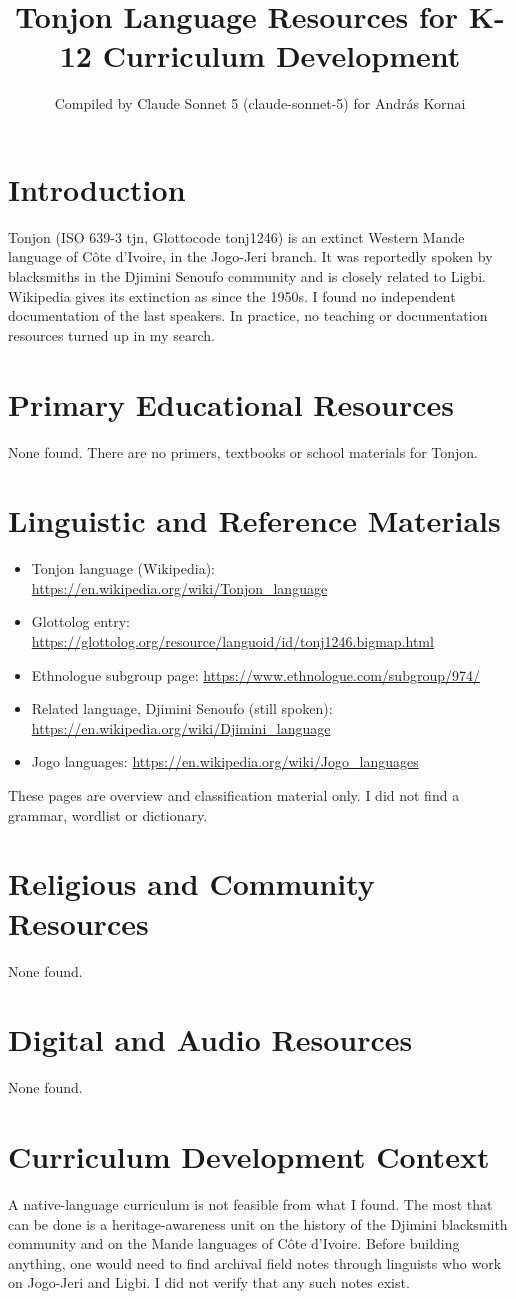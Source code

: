 \documentclass[12pt]{article}
\title{Tonjon Language Resources for K-12 Curriculum Development}
\author{Compiled by Claude Sonnet 5 (claude-sonnet-5) for Andr\'as Kornai}
\date{}
\begin{document}
\maketitle

\section{Introduction}
Tonjon (ISO 639-3 tjn, Glottocode tonj1246) is an extinct Western Mande language of C\^ote d'Ivoire, in the Jogo-Jeri branch. It was reportedly spoken by blacksmiths in the Djimini Senoufo community and is closely related to Ligbi. Wikipedia gives its extinction as since the 1950s. I found no independent documentation of the last speakers. In practice, no teaching or documentation resources turned up in my search.

\section{Primary Educational Resources}
None found. There are no primers, textbooks or school materials for Tonjon.

\section{Linguistic and Reference Materials}
\begin{itemize}
\item Tonjon language (Wikipedia): \url{https://en.wikipedia.org/wiki/Tonjon_language}
\item Glottolog entry: \url{https://glottolog.org/resource/languoid/id/tonj1246.bigmap.html}
\item Ethnologue subgroup page: \url{https://www.ethnologue.com/subgroup/974/}
\item Related language, Djimini Senoufo (still spoken): \url{https://en.wikipedia.org/wiki/Djimini_language}
\item Jogo languages: \url{https://en.wikipedia.org/wiki/Jogo_languages}
\end{itemize}
These pages are overview and classification material only. I did not find a grammar, wordlist or dictionary.

\section{Religious and Community Resources}
None found.

\section{Digital and Audio Resources}
None found.

\section{Curriculum Development Context}
A native-language curriculum is not feasible from what I found. The most that can be done is a heritage-awareness unit on the history of the Djimini blacksmith community and on the Mande languages of C\^ote d'Ivoire. Before building anything, one would need to find archival field notes through linguists who work on Jogo-Jeri and Ligbi. I did not verify that any such notes exist.
\end{document}
